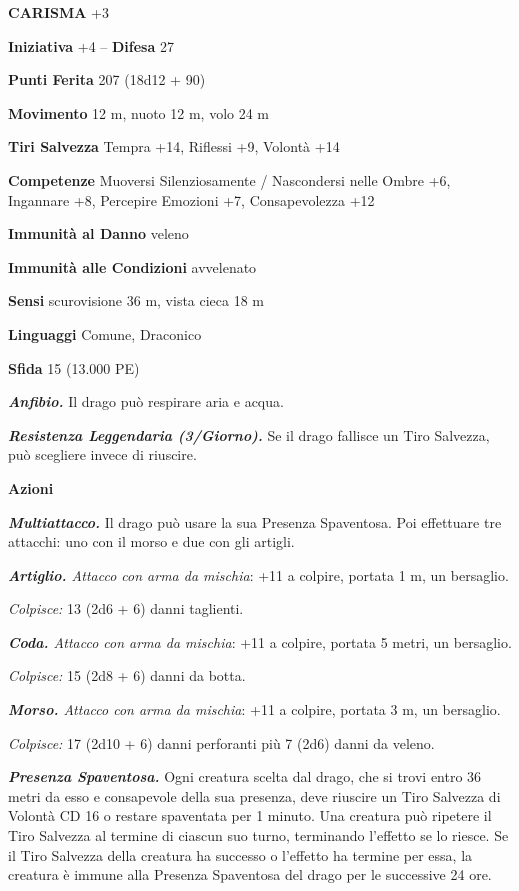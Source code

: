 \begin{multicols}{2}
\textbf{CARISMA} +3

\textbf{Iniziativa} +4 -- \textbf{Difesa} 27

\textbf{Punti Ferita} 207 (18d12 + 90)

\textbf{Movimento} 12 m, nuoto 12 m, volo 24 m

\textbf{Tiri Salvezza} Tempra +14, Riflessi +9, Volontà +14

\textbf{Competenze} Muoversi Silenziosamente / Nascondersi nelle Ombre +6, Ingannare +8, Percepire Emozioni +7, Consapevolezza +12

\textbf{Immunità al Danno} veleno

\textbf{Immunità alle Condizioni} avvelenato

\textbf{Sensi} scurovisione 36 m, vista cieca 18 m

\textbf{Linguaggi} Comune, Draconico

\textbf{Sfida} 15 (13.000 PE)

\emph{\textbf{Anfibio.}} Il drago può respirare aria e acqua.

\emph{\textbf{Resistenza Leggendaria (3/Giorno).}} Se il drago fallisce un Tiro Salvezza, può scegliere invece di riuscire.

\textbf{Azioni}

\emph{\textbf{Multiattacco.}} Il drago può usare la sua Presenza Spaventosa. Poi effettuare tre attacchi: uno con il morso e due con gli artigli.

\emph{\textbf{Artiglio.} Attacco con arma da mischia}: +11 a colpire, portata 1 m, un bersaglio.

\emph{Colpisce:} 13 (2d6 + 6) danni taglienti.

\emph{\textbf{Coda.} Attacco con arma da mischia}: +11 a colpire, portata 5 metri, un bersaglio.

\emph{Colpisce:} 15 (2d8 + 6) danni da botta.

\emph{\textbf{Morso.} Attacco con arma da mischia}: +11 a colpire, portata 3 m, un bersaglio.

\emph{Colpisce:} 17 (2d10 + 6) danni perforanti più 7 (2d6) danni da veleno.

\emph{\textbf{Presenza Spaventosa.}} Ogni creatura scelta dal drago, che si trovi entro 36 metri da esso e consapevole della sua presenza, deve riuscire un Tiro Salvezza di Volontà CD 16 o restare spaventata per 1 minuto. Una creatura può ripetere il Tiro Salvezza al termine di ciascun suo turno, terminando l'effetto se lo riesce. Se il Tiro Salvezza della creatura ha successo o l'effetto ha termine per essa, la creatura è immune alla Presenza Spaventosa del drago per le successive 24 ore.


\end{multicols}
